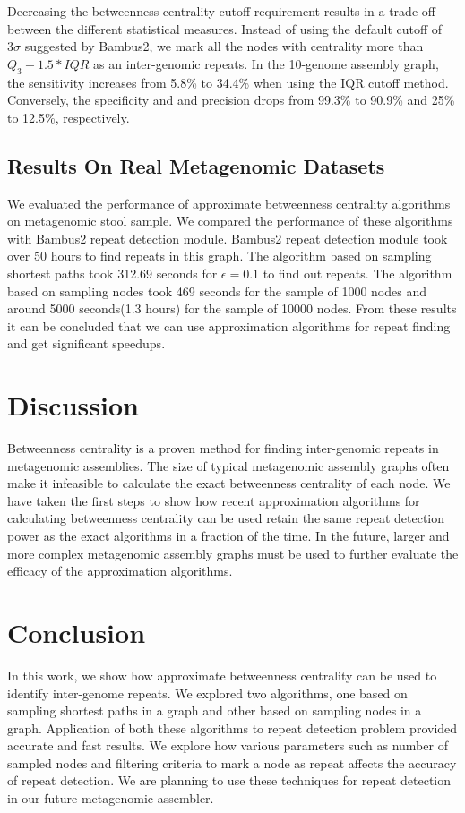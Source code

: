 \documentclass[runningheads,a4paper]{llncs}
\begin{document}
Decreasing the betweenness centrality cutoff requirement results in a trade-off between the different statistical measures.
Instead of using the default cutoff of $3\sigma$ suggested by Bambus2, we mark all the nodes with centrality more than $Q_{3} + 1.5*IQR$ as an inter-genomic repeats.
In the 10-genome assembly graph, the sensitivity increases from 5.8\% to 34.4\% when using the IQR cutoff method.
Conversely, the specificity and and precision drops from 99.3\% to 90.9\% and 25\% to 12.5\%, respectively.


\subsection*{Results On Real Metagenomic Datasets}
We evaluated the performance of approximate betweenness centrality algorithms on metagenomic stool sample. We compared the performance of these algorithms with Bambus2 repeat detection module. Bambus2 repeat detection module took over 50 hours to find repeats in this graph. The algorithm based on sampling shortest paths took 312.69 seconds for $\epsilon = 0.1$ to find out repeats. The algorithm based on sampling nodes took 469 seconds for the sample of 1000 nodes and around 5000 seconds(1.3 hours) for the sample of 10000 nodes. From these results it can be concluded that we can use approximation algorithms for repeat finding and get significant speedups.  


\section{Discussion}
Betweenness centrality is a proven method for finding inter-genomic repeats in metagenomic assemblies.
The size of typical metagenomic assembly graphs often make it infeasible to calculate the exact betweenness centrality of each node.
We have taken the first steps to show how recent approximation algorithms for calculating betweenness centrality can be used retain the same repeat detection power as the exact algorithms in a fraction of the time.
In the future, larger and more complex metagenomic assembly graphs must be used to further evaluate the efficacy of the approximation algorithms.

\section{Conclusion}
In this work, we show how approximate betweenness centrality can be used to identify inter-genome repeats. We explored two algorithms, one based on sampling shortest paths in a graph and other based on sampling nodes in a graph. Application of both these algorithms to repeat detection problem provided accurate and fast results. We explore how various parameters such as number of sampled nodes and filtering criteria to mark a node as repeat affects the accuracy of repeat detection. We are planning to use these techniques for repeat detection in our future metagenomic assembler. 
{}

\end{document}
